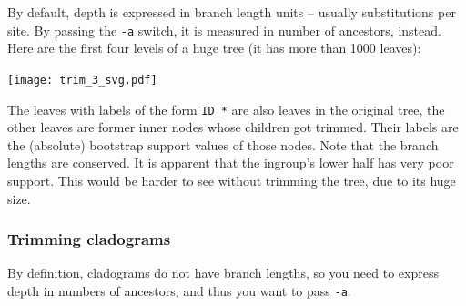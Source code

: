 By default, depth is expressed in branch length units -- usually substitutions
per site. By passing the \texttt{-a} switch, it is measured in number of
ancestors, instead. Here are the first four levels of a huge tree (it has more than 1000 leaves):


\begin{center}
\texttt{[image: trim\_3\_svg.pdf]}
\end{center}

\noindent{}The leaves with labels of the form \texttt{ID *} are also leaves in
the original tree, the other leaves are former inner nodes whose children got
trimmed.  Their labels are the (absolute) bootstrap support values of those
nodes. Note that the branch lengths are conserved. It is apparent that the
ingroup's lower half has very poor support. This would be harder to see without
trimming the tree, due to its huge size.

\subsubsection{Trimming cladograms}

By definition, cladograms do not have branch lengths, so you need to express depth in numbers of ancestors, and thus you want to pass \texttt{-a}.
